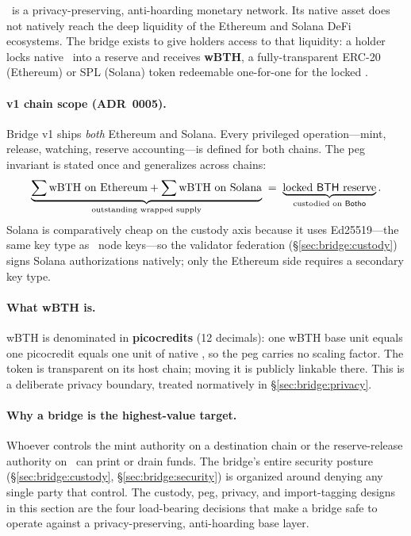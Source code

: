 \Botho\ is a privacy-preserving, anti-hoarding monetary network. Its native
asset does not natively reach the deep liquidity of the Ethereum and Solana
DeFi ecosystems. The bridge exists to give holders access to that liquidity: a
holder locks native \BTH\ into a reserve and receives \textbf{wBTH}, a
fully-transparent ERC-20 (Ethereum) or SPL (Solana) token redeemable
one-for-one for the locked \BTH.

\paragraph{v1 chain scope (ADR~0005).} Bridge v1 ships \emph{both} Ethereum and
Solana. Every privileged operation---mint, release, watching, reserve
accounting---is defined for both chains. The peg invariant is stated once and
generalizes across chains:
\begin{equation}
\label{eq:bridge:peg}
\underbrace{\sum \text{wBTH on Ethereum} + \sum \text{wBTH on Solana}}_{\text{outstanding wrapped supply}}
\;=\; \underbrace{\text{locked \textsf{BTH}\ reserve}}_{\text{custodied on \textsf{Botho}}}.
\end{equation}
Solana is comparatively cheap on the custody axis because it uses Ed25519---the
same key type as \Botho\ node keys---so the validator federation
(\S\ref{sec:bridge:custody}) signs Solana authorizations natively; only the
Ethereum side requires a secondary key type.

\paragraph{What wBTH is.} wBTH is denominated in \textbf{picocredits} (12
decimals): one wBTH base unit equals one picocredit equals one unit of native
\BTH, so the peg carries no scaling factor.
The token is transparent on its host chain; moving it is publicly linkable
there. This is a deliberate privacy boundary, treated normatively in
\S\ref{sec:bridge:privacy}.

\paragraph{Why a bridge is the highest-value target.} Whoever controls the
mint authority on a destination chain or the reserve-release authority on
\Botho\ can print or drain funds. The bridge's entire security posture
(\S\ref{sec:bridge:custody}, \S\ref{sec:bridge:security}) is organized around
denying any single party that control. The custody, peg, privacy, and
import-tagging designs in this section are the four load-bearing decisions that
make a bridge safe to operate against a privacy-preserving, anti-hoarding base
layer.

